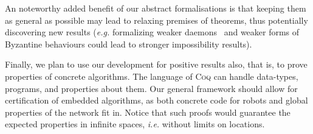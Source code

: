 \documentclass[11pt,a4]{llncs}
\newcommand{\x}{\xspace}
\newcommand{\coq}{\textsc{Coq}\x}
\begin{document}
An noteworthy added benefit of our abstract formalisations is
that keeping them as general as possible may lead to relaxing premises
of theorems, thus potentially discovering new results (\emph{e.g.}
formalizing weaker daemons~\cite{DT11r} and weaker forms of Byzantine behaviours
could lead to stronger impossibility results).

Finally, we plan to use our development for positive results also,
that is, to prove properties of concrete algorithms. The language of
\coq can handle data-types, programs, and properties about them. Our
general framework should allow for certification of embedded
algorithms, as both concrete code for robots and global properties of
the network fit in. Notice that such proofs would
guarantee the expected properties in infinite spaces, \emph{i.e.} without
limits on locations.



\newpage



\end{document}
